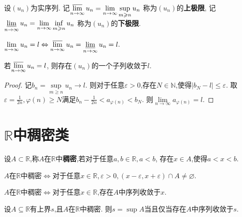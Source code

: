\begin{deff}[上下极限]
    设$(u_n)$为实序列.
    记$\varlimsup\limits_{n\to\infty}u_n=\lim\limits_{n\to\infty}\sup\limits_{m \geqslant n}u_n$
    称为$(u_n)$的\textbf{上极限},
    记$\varliminf\limits_{n\to\infty}u_n=\lim\limits_{n\to\infty}\inf\limits_{m \geqslant n}u_n$
    称为$(u_n)$的\textbf{下极限}.
\end{deff}

\begin{thm}
    $\lim\limits_{n\to\infty}u_n=l \Leftrightarrow 
    \varlimsup\limits_{n\to\infty}u_n=\varliminf\limits_{n\to\infty}u_n=l.$
\end{thm}

\begin{prop}
    若$\varlimsup\limits_{n\to\infty}u_n=l$,
    则存在$(u_n)$的一个子列收敛于$l$.
\end{prop}

\begin{proof}
    记$b_n=\sup\limits_{m \geqslant n}u_n \to l$.
    则对于任意$\varepsilon>0$,存在$N\in\mathbb{N}$,使得$\left\lvert b_N-l \right\rvert \leqslant \varepsilon$.
    取$\varepsilon=\frac{1}{2n},\varphi(n) \geqslant N$满足$b_n-\frac{1}{2n}<a_{\varphi(n)}<b_N$.
    则$\lim\limits_{n\to\infty}a_{\varphi(n)}=l$.
\end{proof}

\section{$\mathbb{R}$中稠密类}

\begin{deff}
    设$A \subset \mathbb{R}$,称$A$在$\mathbb{R}$中\textbf{稠密},若对于任意$a,b \in \mathbb{R},a<b$,
    存在$x \in A$,使得$a<x<b$.
\end{deff}

\begin{prop}
    $A$在$\mathbb{R}$中稠密$\Leftrightarrow$对于任意$x \in \mathbb{R},\varepsilon>0,
    (x-\varepsilon,x+\varepsilon) \cap A \neq \varnothing$.
\end{prop}

\begin{prop}
    $A$在$\mathbb{R}$中稠密$\Leftrightarrow$对于任意$x \in \mathbb{R}$,存在$A$中序列收敛于$x$.
\end{prop}

\begin{prop}
    设$A\subseteq\mathbb{R}$有上界$s$,且$A$在$\mathbb{R}$中稠密.
    则$s=\sup A$当且仅当存在$A$中序列收敛于$s$.
\end{prop}


